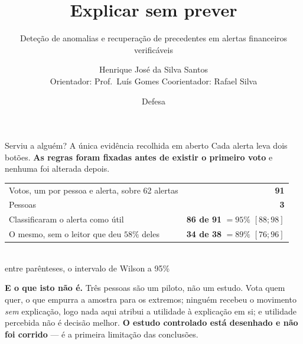 \documentclass[aspectratio=169]{beamer}
\title[\gator]{Explicar sem prever}
\subtitle{\normalsize Deteção de anomalias e recuperação de precedentes em alertas financeiros verificáveis}
\author[H.\ Santos]{Henrique José da Silva Santos \\
  \footnotesize Orientador: Prof.\ Luís Gomes \quad Coorientador: Rafael Silva}
\institute[ISEP]{MEIA, Instituto Superior de Engenharia do Porto}
\date{\footnotesize Defesa}
\begin{document}
\begin{frame}\titlepage\end{frame}

\begin{frame}{Serviu a alguém? A única evidência recolhida em aberto}
Cada alerta leva dois botões. \textbf{As regras foram fixadas antes de existir o primeiro voto}
e nenhuma foi alterada depois.
\vspace{2mm}
\begin{center}
\begin{tabular}{@{}lr@{}}
\toprule
Votos, um por pessoa e alerta, sobre 62 alertas & \textbf{91} \\
Pessoas & \textbf{3} \\
\midrule
Classificaram o alerta como útil & \textbf{86 de 91} $= 95\%$ \; {\scriptsize $[88;98]$} \\
O mesmo, sem o leitor que deu $58\%$ deles & \textbf{34 de 38} $= 89\%$ \; {\scriptsize $[76;96]$} \\
\bottomrule
\end{tabular}
\\[1mm]
{\scriptsize entre parênteses, o intervalo de Wilson a 95\%}
\end{center}
\vspace{1.5mm}
{\footnotesize \textbf{E o que isto não é.} Três pessoas são um piloto, não um estudo. Vota quem
quer, o que empurra a amostra para os extremos; ninguém recebeu o movimento \emph{sem}
explicação, logo nada aqui atribui a utilidade à explicação em si; e utilidade percebida não é
decisão melhor. \textbf{O estudo controlado está desenhado e não foi corrido} --- é a primeira
limitação das conclusões.}
\end{frame}
\end{document}
